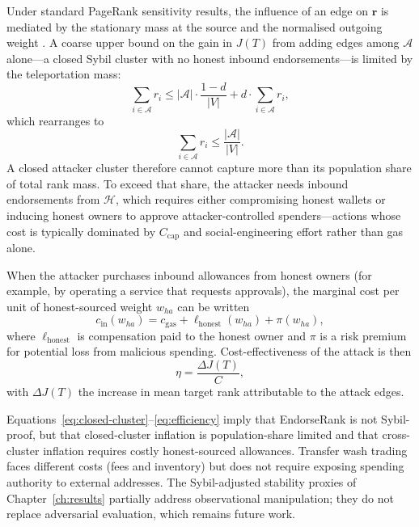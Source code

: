 Under standard PageRank sensitivity results, the influence of an edge on $\mathbf{r}$ is mediated by the stationary mass at the source and the normalised outgoing weight . A coarse upper bound on the gain in $J(T)$ from adding edges among $\mathcal{A}$ alone---a closed Sybil cluster with no honest inbound endorsements---is limited by the teleportation mass:
\begin{equation}
\label{eq:closed-cluster}
\sum_{i\in\mathcal{A}} r_i \leq |\mathcal{A}|\cdot\frac{1-d}{|V|} + d\cdot \sum_{i\in\mathcal{A}} r_i,
\end{equation}
which rearranges to
\begin{equation}
\label{eq:cluster-mass}
\sum_{i\in\mathcal{A}} r_i \leq \frac{|\mathcal{A}|}{|V|}.
\end{equation}
A closed attacker cluster therefore cannot capture more than its population share of total rank mass. To exceed that share, the attacker needs inbound endorsements from $\mathcal{H}$, which requires either compromising honest wallets or inducing honest owners to approve attacker-controlled spenders---actions whose cost is typically dominated by $C_{\mathrm{cap}}$ and social-engineering effort rather than gas alone.

When the attacker purchases inbound allowances from honest owners (for example, by operating a service that requests approvals), the marginal cost per unit of honest-sourced weight $w_{h a}$ can be written
\begin{equation}
\label{eq:marginal}
c_{\mathrm{in}}(w_{h a}) = c_{\mathrm{gas}} + \ell_{\mathrm{honest}}(w_{h a}) + \pi(w_{h a}),
\end{equation}
where $\ell_{\mathrm{honest}}$ is compensation paid to the honest owner and $\pi$ is a risk premium for potential loss from malicious spending. Cost-effectiveness of the attack is then
\begin{equation}
\label{eq:efficiency}
\eta = \frac{\Delta J(T)}{C},
\end{equation}
with $\Delta J(T)$ the increase in mean target rank attributable to the attack edges.

Equations~\eqref{eq:closed-cluster}--\eqref{eq:efficiency} imply that EndorseRank is not Sybil-proof, but that closed-cluster inflation is population-share limited and that cross-cluster inflation requires costly honest-sourced allowances. Transfer wash trading faces different costs (fees and inventory) but does not require exposing spending authority to external addresses. The Sybil-adjusted stability proxies of Chapter~\ref{ch:results} partially address observational manipulation; they do not replace adversarial evaluation, which remains future work.

